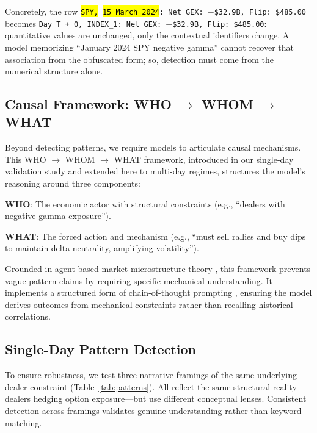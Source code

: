 \documentclass[jrfm,article,accept,moreauthors,pdftex]{Definitions/mdpi}
\begin{document}
Concretely, the row \texttt{\hl{SPY,} %
\hl{15 March 2024}: Net GEX: $-$\$32.9B, Flip: \$485.00} becomes \texttt{Day T + 0, INDEX\_1: Net GEX: $-$\$32.9B, Flip: \$485.00}: quantitative values are unchanged, only the contextual identifiers change. A model memorizing ``January 2024 SPY negative gamma'' cannot recover that association from the obfuscated form; so, detection must come from the numerical structure alone.

\subsection{Causal Framework: \texorpdfstring{WHO $\rightarrow$ WHOM $\rightarrow$ WHAT}{WHO->WHOM->WHAT}}
\label{subsec:causal}

Beyond detecting patterns, we require models to articulate causal mechanisms. This WHO $\rightarrow$ WHOM $\rightarrow$ WHAT framework, introduced in our single-day validation study \mbox{\citep{regan2025obfuscation}} and extended here to multi-day regimes, structures the model's reasoning around three components:

\textbf{WHO}: The economic actor with structural constraints (e.g., ``dealers with negative gamma exposure'').


\textbf{WHAT}: The forced action and mechanism (e.g., ``must sell rallies and buy dips to maintain delta neutrality, amplifying volatility'').

Grounded in agent-based market microstructure theory \citep{grossman1988liquidity,garleanu2009demand}, this framework prevents vague pattern claims by requiring specific mechanical understanding. It implements a structured form of chain-of-thought prompting \citep{wei2022chain}, ensuring the model derives outcomes from mechanical constraints rather than recalling historical correlations.


\subsection{Single-Day Pattern Detection}
\label{subsec:single_day_method}

To ensure robustness, we test three narrative framings of the same underlying dealer constraint (Table~\ref{tab:patterns}). All reflect the same structural reality---dealers hedging option exposure---but use different conceptual lenses. Consistent detection across framings validates genuine understanding rather than keyword matching.
\end{document}
